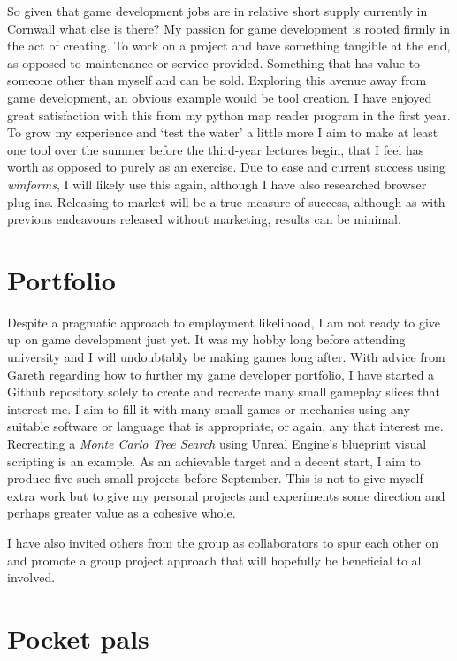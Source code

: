 \documentclass{scrartcl}
\begin{document}
So given that game development jobs are in relative short supply currently in Cornwall what else is there? My passion for game development is rooted firmly in the act of creating. To work on a project and have something tangible at the end, as opposed to maintenance or service provided. Something that has value to someone other than myself and can be sold. Exploring this avenue away from game development, an obvious example would be tool creation. I have enjoyed great satisfaction with this from my python map reader program in the first year. To grow my experience and `test the water' a little more I aim to make at least one tool over the summer before the third-year lectures begin, that I feel has worth as opposed to purely as an exercise. Due to ease and current success using \textit{winforms}, I will likely use this again, although I have also researched browser plug-ins. Releasing to market will be a true measure of success, although as with previous endeavours released without marketing, results can be minimal.

\section*{Portfolio}

Despite a pragmatic approach to employment likelihood, I am not ready to give up on game development just yet. It was my hobby long before attending university and I will undoubtably be making games long after. With advice from Gareth regarding how to further my game developer portfolio, I have started a Github repository solely to create and recreate many small gameplay slices that interest me. I aim to fill it with many small games or mechanics using any suitable software or language that is appropriate, or again, any that interest me. Recreating a \textit{Monte Carlo Tree Search} using Unreal Engine's blueprint visual scripting is an example. As an achievable target and a decent start, I aim to produce five such small projects before September. This is not to give myself extra work but to give my personal projects and experiments some direction and perhaps greater value as a cohesive whole.

I have also invited others from the group as collaborators to spur each other on and promote a group project approach that will hopefully be beneficial to all involved.

\section*{Pocket pals}
\end{document}
